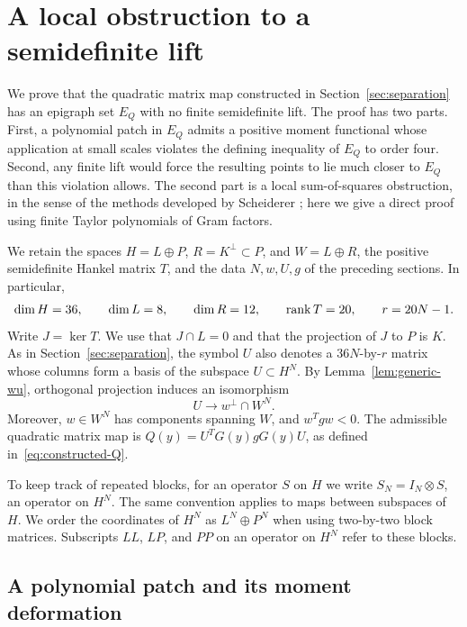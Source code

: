\section{A local obstruction to a semidefinite lift}
\label{sec:obstruction}

We prove that the quadratic matrix map constructed in
Section~\ref{sec:separation} has an epigraph set $E_Q$ with no finite
semidefinite lift.  The proof has two parts.  First, a polynomial patch in
$E_Q$ admits a positive moment functional whose application at small scales
violates the defining inequality of $E_Q$ to order four.  Second, any finite
lift would force the resulting points to lie much closer to $E_Q$ than this
violation allows.  The second part is a local sum-of-squares obstruction,
in the sense of the methods developed by Scheiderer
\cite[Section~4]{Scheiderer2018}; here we give a direct proof using finite
Taylor polynomials of Gram factors.

We retain the spaces $H=L\oplus P$, $R=K^\perp\subset P$, and
$W=L\oplus R$, the positive semidefinite Hankel matrix $T$, and the data
$N,w,U,g$ of the preceding sections.  In particular,
\[
 \dim H=36,\qquad \dim L=8,\qquad \dim R=12,\qquad
 \operatorname{rank} T=20,\qquad r=20N-1.
\]
Write $J=\ker T$.  We use that $J\cap L=0$ and that the projection of $J$
to $P$ is $K$.  As in Section~\ref{sec:separation}, the symbol $U$ also
denotes a $36N$-by-$r$ matrix whose columns form a basis of the subspace
$U\subset H^N$.  By Lemma~\ref{lem:generic-wu}, orthogonal projection
induces an isomorphism
\begin{equation}
 \label{eq:obstruction-U-projection}
 U\longrightarrow w^\perp\cap W^N.
\end{equation}
Moreover, $w\in W^N$ has components spanning $W$, and
$w^Tgw<0$.  The admissible quadratic matrix map is
$Q(y)=U^TG(y)gG(y)U$, as defined in~\eqref{eq:constructed-Q}.

To keep track of repeated blocks, for an operator $S$ on $H$ we write
$S_N=I_N\otimes S$, an operator on $H^N$.  The same convention applies to
maps between subspaces of $H$.  We order the coordinates of $H^N$ as
$L^N\oplus P^N$ when using two-by-two block matrices.  Subscripts $LL$,
$LP$, and $PP$ on an operator on $H^N$ refer to these blocks.

\subsection{A polynomial patch and its moment deformation}


